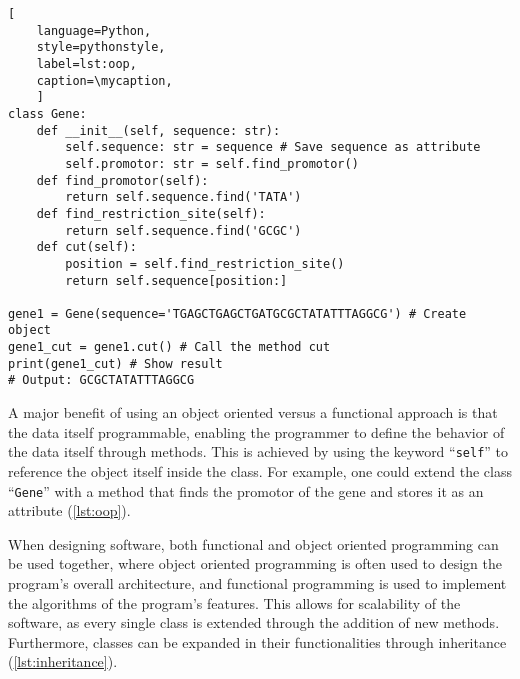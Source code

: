 \def\mycaption{ Example of object oriented programming in Python. The class is
    called ``\texttt{Gene}'' and has four methods, ``\texttt{\_\_init\_\_}'',
    ``\texttt{find\_promotor}'', ``\texttt{find\_restriction\_site}'' and
    ``\texttt{cut}''. The method ``\texttt{\_\_init\_\_}'' is called when
    creating (``initializing'') an object, which fills the object with
    user-defined data. The parameter ``\texttt{self}'' is used to reference the
    object itself internally. ``\texttt{find\_promotor}'' is a
    method that finds the position of the promotor in the gene and is called
    during object initialization. }
\begin{lstlisting}[
    language=Python,
    style=pythonstyle,
    label=lst:oop,
    caption=\mycaption,
    ]
class Gene:
    def __init__(self, sequence: str):
        self.sequence: str = sequence # Save sequence as attribute
        self.promotor: str = self.find_promotor() 
    def find_promotor(self):
        return self.sequence.find('TATA')
    def find_restriction_site(self):
        return self.sequence.find('GCGC')
    def cut(self):
        position = self.find_restriction_site()
        return self.sequence[position:]

gene1 = Gene(sequence='TGAGCTGAGCTGATGCGCTATATTTAGGCG') # Create object
gene1_cut = gene1.cut() # Call the method cut
print(gene1_cut) # Show result
# Output: GCGCTATATTTAGGCG
\end{lstlisting}

A major benefit of using an object oriented versus a functional approach is that
the data itself programmable, enabling the programmer to define the behavior of
the data itself through methods. This is achieved by using the keyword
``\texttt{self}'' to reference the object itself inside the class. For example,
one could extend the class ``\texttt{Gene}'' with a method that finds the
promotor of the gene and stores it as an attribute (\autoref{lst:oop}).

When designing software, both functional and object oriented programming can be
used together, where object oriented programming is often used to design the
program's overall architecture, and functional programming is used to implement
the algorithms of the program's features. This allows for scalability of the
software, as every single class is extended through the addition of new methods.
Furthermore, classes can be expanded in their functionalities through
inheritance (\autoref{lst:inheritance}).



